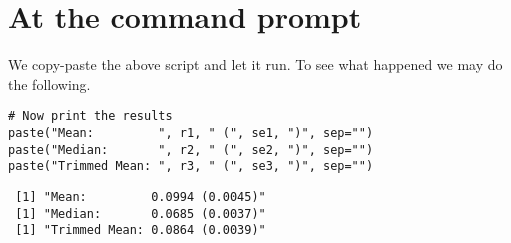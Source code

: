 \documentclass[11pt,english]{article}
\begin{document}
\section*{At the command prompt}
\label{sec-2}

We copy-paste the above script and let it run. To see what happened we may do the following.


\begin{verbatim}
# Now print the results
paste("Mean:         ", r1, " (", se1, ")", sep="")
paste("Median:       ", r2, " (", se2, ")", sep="")
paste("Trimmed Mean: ", r3, " (", se3, ")", sep="")
\end{verbatim}




\begin{verbatim}
 [1] "Mean:         0.0994 (0.0045)"
 [1] "Median:       0.0685 (0.0037)"
 [1] "Trimmed Mean: 0.0864 (0.0039)"
\end{verbatim}
\end{document}

